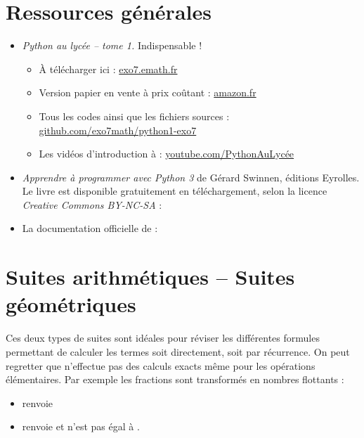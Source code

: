 \documentclass[11pt,class=report,crop=false]{standalone}
\begin{document}



\section*{Ressources générales}

\begin{itemize}
	\item \emph{Python au lycée -- tome 1.} Indispensable !
	\begin{itemize}
		\item \`A télécharger ici : 
		\href{http://exo7.emath.fr/}{exo7.emath.fr}
		\item Version papier en vente à prix coûtant : \href{https://www.amazon.fr/dp/1091267510}{amazon.fr}
		\item Tous les codes \Python{} ainsi que les fichiers sources :  \href{https://github.com/exo7math/python1-exo7}{github.com/exo7math/python1-exo7}
		\item Les vidéos d'introduction à \Python{} : \href{https://www.youtube.com/channel/UC6PiFyqBiUjiJ7Q3DRSW2Wg}{youtube.com/PythonAuLycée}
	\end{itemize}
	
	  \item \emph{Apprendre à programmer avec Python 3} de Gérard Swinnen, éditions Eyrolles. Le livre est disponible gratuitement en téléchargement, selon la licence \emph{Creative Commons BY-NC-SA} :	  
  \item La documentation officielle de \Python{} :  

\end{itemize}


\section{Suites arithmétiques -- Suites géométriques}

Ces deux types de suites sont idéales pour réviser les différentes formules permettant de calculer les termes soit directement, soit par récurrence.
On peut regretter que \Python{} n'effectue pas des calculs exacts même pour les opérations élémentaires. Par exemple les fractions sont transformés en nombres flottants :
\begin{itemize}
	\item {} renvoie 
	\item {} renvoie  et n'est pas égal à .
\end{itemize}
\end{document}
